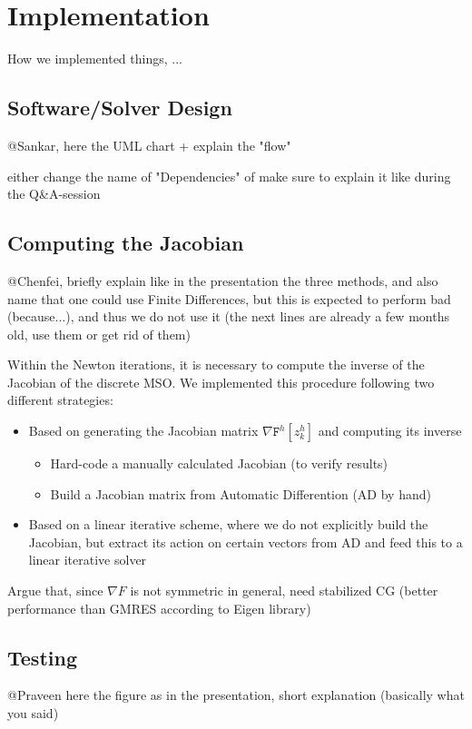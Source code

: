 \documentclass[11pt]{scrartcl}
\newcommand{\mSurfDisc}[1]{\ensuremath{\mathtt{F}^h\left[#1\right]}}
\begin{document}
\section{Implementation}

How we implemented things, ...

\subsection{Software/Solver Design}
@Sankar, here the UML chart + explain the "flow"

either change the name of "Dependencies" of make sure to explain it like during the Q\&A-session

\subsection{Computing the Jacobian}
@Chenfei, briefly explain like in the presentation the three methods, and also name that one could use Finite Differences, but this is expected to perform bad (because...), and thus we do not use it (the next lines are already a few months old, use them or get rid of them)

Within the Newton iterations, it is necessary to compute the inverse of the Jacobian of the discrete MSO. We implemented this procedure following two different strategies:
\begin{itemize}
	\item Based on generating the Jacobian matrix $\nabla\mSurfDisc{z^h_k}$ and computing its inverse
	\begin{itemize}
		\item Hard-code a manually calculated Jacobian (to verify results)
		\item Build a Jacobian matrix from Automatic Differention (AD by hand)
	\end{itemize}
	\item Based on a linear iterative scheme, where we do not explicitly build the Jacobian, but extract its action on certain vectors from AD and feed this to a linear iterative solver
\end{itemize}

Argue that, since $\nabla F$ is not symmetric in general, need stabilized CG (better performance than GMRES according to Eigen library)


\subsection{Testing}
@Praveen
here the figure as in the presentation, short explanation (basically what you said)
\end{document}
